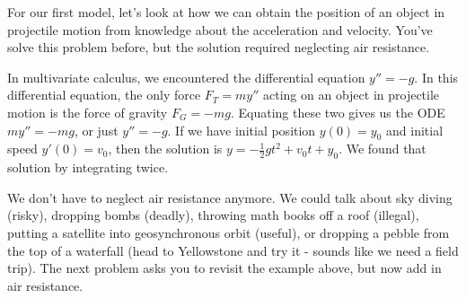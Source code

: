 For our first model, let's look at how we can obtain the position of an object in projectile motion from knowledge about the acceleration and velocity.  You've solve this problem before, but the solution required neglecting air resistance. 
\begin{example}
In multivariate calculus, we encountered the differential equation $y''=-g$. In this differential equation, the only force $F_T=my''$ acting on an object in projectile motion is the force of gravity $F_G=-mg$. Equating these two gives us the ODE $my''=-mg$, or just $y''=-g$.  If we have initial position $y(0)=y_0$ and initial speed $y'(0)=v_0$, then the solution is $y=-\frac{1}{2}gt^2+v_0t+y_0$. We found that solution by integrating twice. 
\end{example}
We don't have to neglect air resistance anymore.  We could talk about sky diving (risky), dropping bombs (deadly), throwing math books off a roof (illegal), putting a satellite into geosynchronous orbit (useful), or dropping a pebble from the top of a waterfall (head to Yellowstone and try it - sounds like we need a field trip). The next problem asks you to revisit the example above, but now add in air resistance.
